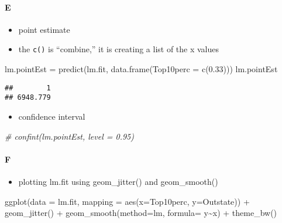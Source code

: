 \documentclass[
]{article}
\newenvironment{Shaded}{\begin{snugshade}}{\end{snugshade}}
\newcommand{\AttributeTok}[1]{\textcolor[rgb]{0.77,0.63,0.00}{#1}}
\newcommand{\CommentTok}[1]{\textcolor[rgb]{0.56,0.35,0.01}{\textit{#1}}}
\newcommand{\FloatTok}[1]{\textcolor[rgb]{0.00,0.00,0.81}{#1}}
\newcommand{\FunctionTok}[1]{\textcolor[rgb]{0.00,0.00,0.00}{#1}}
\newcommand{\NormalTok}[1]{#1}
\newcommand{\OtherTok}[1]{\textcolor[rgb]{0.56,0.35,0.01}{#1}}
\newcommand{\SpecialCharTok}[1]{\textcolor[rgb]{0.00,0.00,0.00}{#1}}
\newcommand{\StringTok}[1]{\textcolor[rgb]{0.31,0.60,0.02}{#1}}
\providecommand{\tightlist}{%
  \setlength{\itemsep}{0pt}\setlength{\parskip}{0pt}}
\begin{document}
\hypertarget{e}{%
\paragraph{E}\label{e}}

\begin{itemize}
\tightlist
\item
  point estimate
\item
  the \texttt{c()} is ``combine,'' it is creating a list of the x values
\end{itemize}

\begin{Shaded}
\begin{Highlighting}[]
\NormalTok{lm.pointEst }\OtherTok{=} \FunctionTok{predict}\NormalTok{(lm.fit, }\FunctionTok{data.frame}\NormalTok{(}\AttributeTok{Top10perc =} \FunctionTok{c}\NormalTok{(}\FloatTok{0.33}\NormalTok{)))}
\NormalTok{lm.pointEst}
\end{Highlighting}
\end{Shaded}

\begin{verbatim}
##        1 
## 6948.779
\end{verbatim}

\begin{itemize}
\tightlist
\item
  confidence interval
\end{itemize}

\begin{Shaded}
\begin{Highlighting}[]
\CommentTok{\# confint(lm.pointEst, level = 0.95)}
\end{Highlighting}
\end{Shaded}

\hypertarget{f}{%
\paragraph{F}\label{f}}

\begin{itemize}
\tightlist
\item
  plotting lm.fit using geom\_jitter() and geom\_smooth()
\end{itemize}

\begin{Shaded}
\begin{Highlighting}[]
\FunctionTok{ggplot}\NormalTok{(}\AttributeTok{data =}\NormalTok{ lm.fit, }\AttributeTok{mapping =} \FunctionTok{aes}\NormalTok{(}\AttributeTok{x=}\NormalTok{Top10perc, }\AttributeTok{y=}\NormalTok{Outstate)) }\SpecialCharTok{+} \FunctionTok{geom\_jitter}\NormalTok{() }\SpecialCharTok{+} \FunctionTok{geom\_smooth}\NormalTok{(}\AttributeTok{method=}\StringTok{\textquotesingle{}lm\textquotesingle{}}\NormalTok{, }\AttributeTok{formula=}\NormalTok{ y}\SpecialCharTok{\textasciitilde{}}\NormalTok{x) }\SpecialCharTok{+} \FunctionTok{theme\_bw}\NormalTok{()}
\end{Highlighting}
\end{Shaded}
\end{document}

